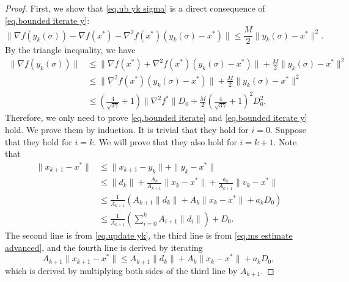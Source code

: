 \documentclass{mcom-l}
\numberwithin{equation}{section}
\begin{document}
\begin{proof}
    First, we show that \eqref{eq.ub yk sigma} is a direct consequence of \eqref{eq.bounded iterate y}:
    \begin{equation*}
        \|\nabla f(y_k(\sigma)) - \nabla f(x^*) -\nabla^2 f(x^*)(y_k(\sigma)-x^*)\| \leq \frac{M}{2}\|y_k(\sigma)-x^*\|^2.
    \end{equation*}
    By the triangle inequality, we have
    \begin{equation*}
        \begin{aligned}
            \|\nabla f(y_k(\sigma)) \| & \leq \|\nabla f(x^*)+\nabla^2 f(x^*)(y_k(\sigma)-x^*)\| +\frac{M}{2}\|y_k(\sigma)-x^*\|^2                                    \\
                                       & \leq \|\nabla^2 f(x^*)(y_k(\sigma)-x^*)\|+\frac{M}{2}\|y_k(\sigma)-x^*\|^2                                                   \\
                                       & \leq \left(\frac{4}{\sqrt{3\gamma}}+1\right)\|\nabla ^2 f^*\|D_0+\frac{M}{2}\left(\frac{4}{\sqrt{3\gamma}}+1\right)^2 D_0^2.
        \end{aligned}
    \end{equation*}
    Therefore, we only need to prove \eqref{eq.bounded iterate} and \eqref{eq.bounded iterate y} hold. We prove them by induction. It is trivial that they hold for $i=0$. Suppose that they hold for $i=k$. We will prove that they also hold for $i=k+1$. Note that
    \begin{equation*}
        \begin{aligned}
            \|x_{k+1}-x^*\| & \leq \|x_{k+1}-y_k\| + \|y_k-x^*\|                                            \\
                            & \leq \|d_k\|+ \frac{A_k}{A_{k+1}} \|x_k-x^*\| +\frac{a_k}{A_{k+1}}\|v_k-x^*\| \\
                            & \leq \frac{1}{A_{k+1}}\left(A_{k+1}\|d_k\| +A_k\|x_k-x^*\| +  a_k D_0\right)  \\
                            & \leq \frac{1}{A_{k+1}}\left (\sum_{i=0}^k A_{i+1}\|d_i\|\right)+D_0.
        \end{aligned}
    \end{equation*}
    The second line is from \eqref{eq.update yk}, the third line is from \eqref{eq.ms estimate advanced}, and the fourth line is derived by iterating
    \begin{equation*}
        A_{k+1} \|x_{k+1}-x^*\|\leq A_{k+1}\|d_k\|+A_k\|x_k-x^*\|+a_k D_0,
    \end{equation*}
    which is derived by multiplying both sides of the third line by $A_{k+1}$.


\end{proof}
\end{document}
